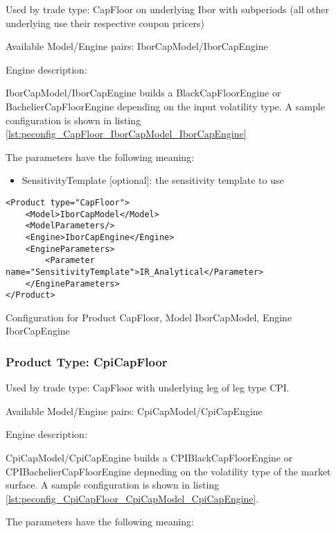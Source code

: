 Used by trade type: CapFloor on underlying Ibor with subperiods (all other underlying use their respective coupon pricers)

Available Model/Engine pairs: IborCapModel/IborCapEngine

Engine description:

IborCapModel/IborCapEngine builds a BlackCapFloorEngine or BachelierCapFloorEngine depending on the input volatility
type. A sample configuration is shown in listing \ref{lst:peconfig_CapFloor_IborCapModel_IborCapEngine}

The parameters have the following meaning:

\begin{itemize}
\item SensitivityTemplate [optional]: the sensitivity template to use 
\end{itemize}

\begin{longlisting}
\begin{verbatim}
<Product type="CapFloor">
    <Model>IborCapModel</Model>
    <ModelParameters/>
    <Engine>IborCapEngine</Engine>
    <EngineParameters>
        <Parameter name="SensitivityTemplate">IR_Analytical</Parameter>
    </EngineParameters>
</Product>
\end{verbatim}
\caption{Configuration for Product CapFloor, Model IborCapModel, Engine IborCapEngine}
\label{lst:peconfig_lst:peconfig_CapFloor_IborCapModel_IborCapEngine}
\end{longlisting}

\subsubsection{Product Type: CpiCapFloor}

Used by trade type: CapFloor with underlying leg of leg type CPI.

Available Model/Engine pairs: CpiCapModel/CpiCapEngine

Engine description:

CpiCapModel/CpiCapEngine builds a CPIBlackCapFloorEngine or CPIBachelierCapFloorEngine depneding on the volatility type
of the market surface. A sample configuration is shown in listing
\ref{lst:peconfig_CpiCapFloor_CpiCapModel_CpiCapEngine}.

The parameters have the following meaning:

